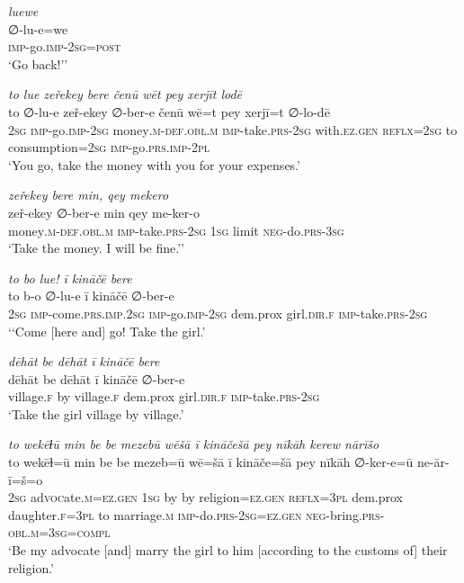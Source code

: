 \ea \label{ŽP.95}
\textit{luewe} \\ 
\gll ∅-lu-e=we \\ 
 \textsc{imp-}go.\textsc{imp-}\textsc{2sg}\textsc{=\textsc{post}} \\ 
\glt `Go back!’'
\z 
 
\ea \label{ŽP.103}
\textit{to lue zeřekey bere čenū wēt pey xerjīt lodē} \\ 
\gll to ∅-lu-e zeř-ekey ∅-ber-e čenū wē=t pey xerjī=t ∅-lo-dē \\ 
 \textsc{2sg} \textsc{imp-}go.\textsc{imp-}\textsc{2sg} money\textsc{.m}\textsc{-def}\textsc{.obl}\textsc{.m} \textsc{imp-}take\textsc{.prs}-\textsc{2sg} with\textsc{.ez.gen} \textsc{reflx}\textsc{=\textsc{2sg}} to consumption\textsc{=\textsc{2sg}} \textsc{imp-}go\textsc{.prs}.\textsc{imp-}\textsc{2pl} \\ 
\glt `You go, take the money with you for your expenses.'
\z 
 
\ea \label{ŽP.104}
\textit{zeřekey bere min, qey mekero} \\ 
\gll zeř-ekey ∅-ber-e min qey me-ker-o \\ 
 money\textsc{.m}\textsc{-def}\textsc{.obl}\textsc{.m} \textsc{imp-}take\textsc{.prs}-\textsc{2sg} \textsc{1sg} limit \textsc{neg-}do\textsc{.prs}\textsc{-3sg} \\ 
\glt `Take the money. I will be fine.’'
\z 
 
\ea \label{ŽP.159}
\textit{to bo lue! ī kināčē bere} \\ 
\gll to b-o ∅-lu-e ī kināčē ∅-ber-e \\ 
 \textsc{2sg} \textsc{imp-}come\textsc{.prs}\textsc{.imp}\textsc{.\textsc{2sg}} \textsc{imp-}go.\textsc{imp-}\textsc{2sg} dem.prox girl\textsc{.dir}\textsc{.f} \textsc{imp-}take\textsc{.prs}-\textsc{2sg} \\ 
\glt `‘Come [here and] go! Take the girl.'
\z 
 
\ea \label{ŽP.162}
\textit{dēhāt be dēhāt ī kināčē bere} \\ 
\gll dēhāt be dēhāt ī kināčē ∅-ber-e \\ 
 village\textsc{.f} by village\textsc{.f} dem.prox girl\textsc{.dir}\textsc{.f} \textsc{imp-}take\textsc{.prs}-\textsc{2sg} \\ 
\glt `Take the girl village by village.'
\z 
 
\ea \label{ŽP.165}
\textit{to wekēɫū min be be mezebū wēšā ī kināčešā pey nīkāh kerew nārīšo} \\ 
\gll to wekēɫ=ū min be be mezeb=ū wē=šā ī kināče=šā pey nīkāh ∅-ker-e=ū ne-ār-ī=š=o \\ 
 \textsc{2sg} ad\textsc{voc}ate\textsc{.m}\textsc{\textsc{=ez.gen}} \textsc{1sg} by by religion\textsc{\textsc{=ez.gen}} \textsc{reflx}\textsc{=3pl} dem.prox daughter\textsc{.f}\textsc{=3pl} to marriage\textsc{.m} \textsc{imp-}do\textsc{.prs}-\textsc{2sg}\textsc{\textsc{=ez.gen}} \textsc{neg-}bring\textsc{.prs}\textsc{-obl}\textsc{.m}\textsc{=3sg}\textsc{=compl} \\ 
\glt `Be my advocate [and] marry the girl to him [according to the customs of] their religion.'
\z 
 

